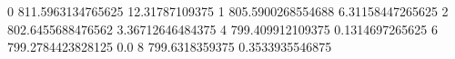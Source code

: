 0 811.5963134765625 12.31787109375
1 805.5900268554688 6.31158447265625
2 802.6455688476562 3.36712646484375
4 799.409912109375 0.1314697265625
6 799.2784423828125 0.0
8 799.6318359375 0.3533935546875
